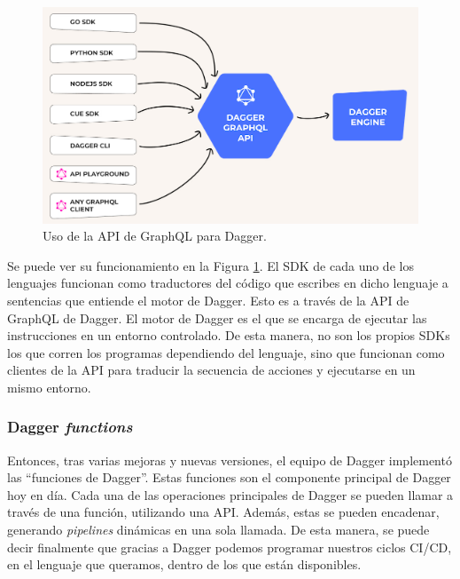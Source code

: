 \begin{figure}
  \centerline{\includegraphics[width=14cm]{figuras/graphql}}
  \caption{Uso de la API de GraphQL para Dagger.\cite{img:graphql}}
  \label{fig:graphql}
\end{figure}

Se puede ver su funcionamiento en la Figura \ref{fig:graphql}. El SDK de cada uno de los lenguajes funcionan como traductores del código que escribes en dicho lenguaje a sentencias que entiende el motor de Dagger. Esto es a través de la API de GraphQL de Dagger. El motor de Dagger es el que se encarga de ejecutar las instrucciones en un entorno controlado. De esta manera, no son los propios SDKs los que corren los programas dependiendo del lenguaje, sino que funcionan como clientes de la API para traducir la secuencia de acciones y ejecutarse en un mismo entorno.

\subsubsection*{Dagger \textit{functions}}

Entonces, tras varias mejoras y nuevas versiones, el equipo de Dagger implementó las ``funciones de Dagger''. Estas funciones son el componente principal de Dagger hoy en día. Cada una de las operaciones principales de Dagger se pueden llamar a través de una función, utilizando una API. Además, estas se pueden encadenar, generando \textit{pipelines} dinámicas en una sola llamada. De esta manera, se puede decir finalmente que gracias a Dagger podemos programar nuestros ciclos CI/CD, en el lenguaje que queramos, dentro de los que están disponibles.


